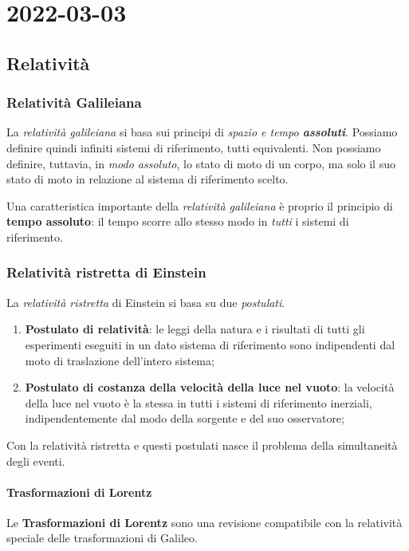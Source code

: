 \chapter{2022-03-03} %
\section{Relatività}
\subsection{Relatività Galileiana}
La \textit{relatività galileiana} si basa sui principi di \textit{spazio e
tempo \textbf{assoluti}}. Possiamo definire quindi infiniti sistemi di
riferimento, tutti equivalenti. Non possiamo definire, tuttavia, in
\textit{modo assoluto}, lo stato di moto di un corpo, ma solo il suo stato di
moto in relazione al sistema di riferimento scelto.

Una caratteristica importante della \textit{relatività galileiana} è proprio il
principio di \textbf{tempo assoluto}: il tempo scorre allo stesso modo in
\textit{tutti} i sistemi di riferimento.

\subsection{Relatività ristretta di Einstein}
La \textit{relatività ristretta} di Einstein si basa su due \textit{postulati}.
\begin{enumerate}
  \item \textbf{Postulato di relatività}: le leggi della natura e i risultati
    di tutti gli esperimenti eseguiti in un dato sistema di riferimento sono
    indipendenti dal moto di traslazione dell'intero sistema;
  \item \textbf{Postulato di costanza della velocità della luce nel vuoto}: la
    velocità della luce nel vuoto è la stessa in tutti i sistemi di riferimento
    inerziali, indipendentemente dal modo della sorgente e del suo osservatore;
\end{enumerate}

\begin{note}[Simultaneità]
  Con la relatività ristretta e questi postulati nasce il problema della
  simultaneità degli eventi.
\end{note}

\subsubsection{Trasformazioni di Lorentz}
Le \textbf{Trasformazioni di Lorentz} sono una revisione compatibile con la
relatività speciale delle trasformazioni di Galileo.

